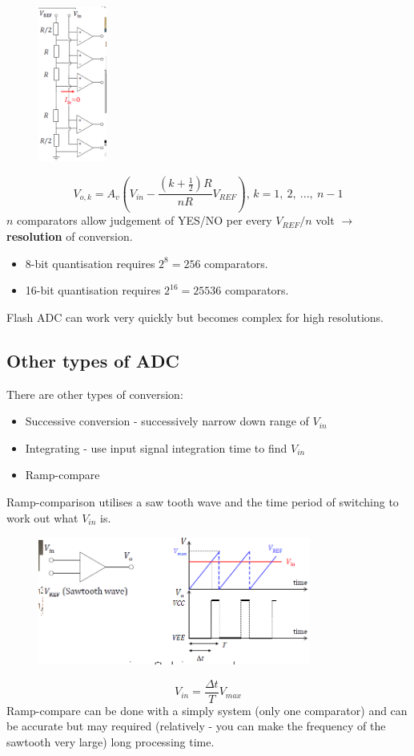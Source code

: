 \documentclass[class=report, crop=false, 12pt,a4paper]{standalone}
\begin{document}
\begin{figure}[H]
  \centering
  \includegraphics[width = 0.2\textwidth]{../img/diagram58.png}
\end{figure}
\begin{equation}
  V_{o, k} = A_v \left(V_{in} - \frac{\left(k + \frac{1}{2}\right)R}{nR} V_{REF}\right) \textrm{, } k = 1, \ 2, \ ..., \ n-1 
\end{equation}
$n$ comparators allow judgement of YES/NO per every $V_{REF} / n$ volt $\rightarrow$ \textbf{resolution} of conversion. 
\begin{itemize}
  \item 8-bit quantisation requires $2^8 = 256$ comparators.
  \item 16-bit quantisation requires $2^{16} = 25536$ comparators.
\end{itemize}
Flash ADC can work very quickly but becomes complex for high resolutions.
\subsection{Other types of ADC}
There are other types of conversion:
\begin{itemize}
  \item Successive conversion - successively narrow down range of $V_{in}$
  \item Integrating - use input signal integration time to find $V_{in}$
  \item Ramp-compare
\end{itemize}
Ramp-comparison utilises a saw tooth wave and the time period of switching to work out what $V_{in}$ is.
\begin{figure}[H]
  \centering
  \includegraphics[width = 0.8\textwidth]{../img/diagram59.png}
\end{figure}
\begin{equation}
  V_{in} = \frac{\Delta t}{T} V_{max}
\end{equation}
Ramp-compare can be done with a simply system (only one comparator) and can be accurate but may required (relatively - you can make the frequency of the sawtooth very large) long processing time.
\end{document}
